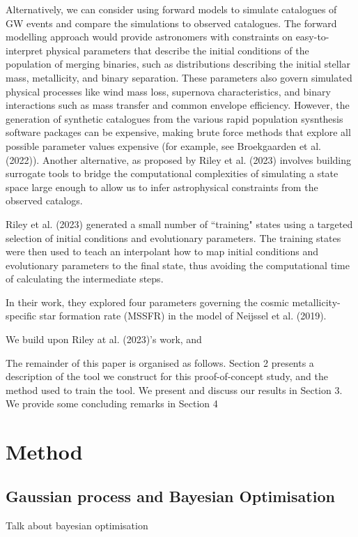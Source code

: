 \documentclass[twocolumn]{aastex631}
\begin{document}
Alternatively, we can consider using forward models to simulate catalogues of GW events and compare the simulations to observed catalogues.
The forward modelling approach would provide astronomers with constraints on easy-to-interpret physical parameters that describe the initial conditions of the population of merging binaries, such as distributions describing the initial stellar mass, metallicity, and binary separation.
These parameters also govern simulated physical processes like wind mass loss, supernova characteristics, and binary interactions such as mass transfer and common envelope efficiency.
However, the generation of synthetic catalogues from the various rapid population sysnthesis software packages can be expensive, making brute force methods that explore all possible parameter values expensive (for example, see  Broekgaarden et al. (2022)).
Another alternative, as proposed by Riley et al. (2023) involves building surrogate tools to bridge the computational complexities of simulating a state space large enough
to allow us to infer astrophysical constraints from the observed catalogs.

Riley et al. (2023) generated a small number of ``training" states using a
targeted selection of initial conditions and evolutionary
parameters.
The training states were then used to teach an interpolant how to
map initial conditions and evolutionary parameters to
the final state, thus avoiding the computational time
of calculating the intermediate steps.

In their work, they explored four parameters governing the cosmic metallicity-specific star formation rate (MSSFR) in the model of Neijssel et al. (2019).

We build upon Riley at al. (2023)'s work, and

The remainder of this paper is organised as follows.
Section 2 presents a description of the tool we construct
for this proof-of-concept study, and the method used
to train the tool.
We present and discuss our results in Section 3.
We provide some concluding remarks in  Section 4



\section{Method}
\subsection{Gaussian process and Bayesian Optimisation}
Talk about bayesian optimisation
\end{document}

